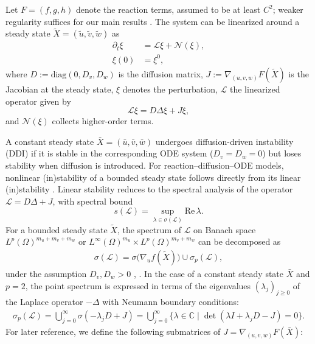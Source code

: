\documentclass[12pt, a4paper]{amsart}
\numberwithin{equation}{section}
\newcommand{\diag}{\mathrm{diag}}
\renewcommand{\Re}{\mathrm{Re}\,}
\newcommand{\CSS}{\bar{X}}
\newcommand{\Cun}{\bar{\un}}
\newcommand{\Cus}{\bar{\us}}
\newcommand{\Cuf}{\bar{\uf}}
\newcommand{\NSS}{\tilde{X}}
\newcommand{\Nun}{\tilde{\un}}
\newcommand{\Nus}{\tilde{\us}}
\newcommand{\Nuf}{\tilde{\uf}}
\newcommand{\un}{u}
\newcommand{\us}{v}
\newcommand{\uf}{w}
\newcommand{\Ds}{D_v}
\newcommand{\Df}{D_w}
\newcommand{\mn}{m_{u}}  %
\newcommand{\ms}{m_{v}}  %
\newcommand{\mfa}{m_{w}} %
\newcommand{\fn}{f}
\newcommand{\fs}{g}
\newcommand{\ffa}{h}
\renewcommand{\L}{{\mathcal{L}}}
\newcommand{\N}{{\mathcal{N}}}
\begin{document}
Let $F=(\fn,\fs,\ffa)$ denote the reaction terms, assumed to be at least $C^2$; weaker regularity suffices for our main results \cite{KMMü23}. The system can be linearized around a steady state $\NSS=(\Nun,\Nus,\Nuf)$ as
\begin{align}\label{eq:Model_lin_around_steady_state}
    \partial_t \xi &= \L \xi + \N(\xi), \\ \xi(0) &= \xi^0,
\end{align}
where $D:=\diag(0,\Ds,\Df)$ is the diffusion matrix, $J := \nabla_{(\un, \us, \uf)}F(\NSS)$ is the Jacobian at the steady state, $\xi$ denotes the perturbation, $\L$ the linearized operator given by
\[
\L \xi = D \Delta \xi + J \xi,
\]
and $\N(\xi)$ collects higher-order terms.

A constant steady state $\CSS=(\Cun,\Cus,\Cuf)$ undergoes diffusion-driven instability (DDI) if it is stable in the corresponding ODE system ($\Ds=\Df=0$) but loses stability when diffusion is introduced.
For reaction--diffusion--ODE models, nonlinear (in)stability of a bounded steady state follows directly from its linear (in)stability \cite[Theorems 3.3 and 3.7]{KMMü23}.
Linear stability reduces to the spectral analysis of the operator $\L=D\Delta+J$,
with spectral bound 
$$s(\L) = \sup_{\lambda\in\sigma(\L)} \Re \lambda.$$
For a bounded steady state $\NSS$, the spectrum of $\mathcal{L}$ on Banach space $L^p(\Omega)^{\mn+\ms+\mfa}$ or $L^\infty(\Omega)^{\mn}\times L^p(\Omega)^{\ms+\mfa}$ can be decomposed as
\begin{align}\label{eq:Spectrum_of_general_L}
    \sigma(\L) = \sigma\big(\nabla_{\un} \fn (\NSS)\big) \cup \sigma_p(\L),
\end{align}
under the assumption $\Ds, \Df >0$ \cite[Section 5.22]{Kowall_2}, \cite[Proposition 2.3]{KMMü23}.
In the case of a constant steady state $\CSS$ and $p=2$, the point spectrum is expressed in terms of the eigenvalues $(\lambda_j)_{j\ge0}$ of the Laplace operator $-\Delta$ with Neumann boundary conditions:
\begin{align}\label{eq:eigenvalues_at_constant_steady_state}
    \sigma_p(\L) = \bigcup_{j=0}^\infty \sigma(-\lambda_j D + J) = \bigcup_{j=0}^\infty \big\{\lambda\in\mathbb{C} \mid \det(\lambda I + \lambda_j D - J) = 0\big\}.
\end{align}
For later reference, we define the following submatrices of $J = \nabla_{(\un, \us, \uf)}F(\CSS)$:
\end{document}
